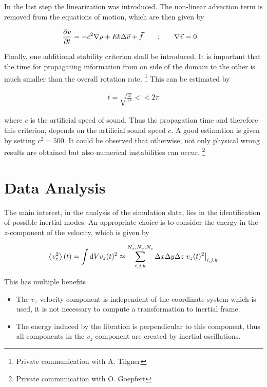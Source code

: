In the last step the linearization was introduced.
The non-linear advection term is removed from the equations of motion, which
are then given by

\begin{align}
    \label{cone_theorie:rotns}
    \pdn[v]{t} = -c^2\nabla \rho + \Ekman \Delta \vec{v} + \vec{f} \qquad;& \qquad  \nabla \vec{v} = 0
\end{align}

Finally, one additional stability criterion shall be introduced.
It is important that the time for propagating information from on side of the domain
to the other is much smaller than the overall rotation rate.
\footnote{Private communication with A. Tilgner}
This can be estimated by

\begin{align}
    t = \sqrt{\frac{2}{c^2}} << 2\pi
\end{align}

where $c$ is the artificial speed of sound.
Thus the propagation time and therefore this criterion, depends on the artificial sound speed $c$.
A good estimation is given by setting $c^2 = 500$.
It could be observed that otherwise, not only physical wrong results are obtained but also
numerical instabilities can occur.
\footnote{Private communication with O. Goepfert}

\newpage

\section{Data Analysis}

The main interest, in the analysis of the simulation data, lies in the identification of possible inertial modes.
An appropriate choice is to consider the energy in the $z$-component of the  velocity, which is given by

\begin{align}
    \left<v_z^2 \right>(t) =  \int \mathop{}\!\mathrm{d} V v_z(t)^2 \approx \sum_{i, j, k}^{N_x,N_y,N_z} \Delta x \Delta y \Delta z \left.v_z(t)^2 \right|_{i,j,k}
\end{align}

This has multiple benefits

\begin{itemize}
    \item The $v_z$-velocity component is independent of the coordinate system which is used, it is not necessary
                to compute a transformation to inertial frame.
    \item The energy induced by the libration is perpendicular to this component, thus all components
            in the $v_z$-component are created by inertial oscillations.
\end{itemize}

